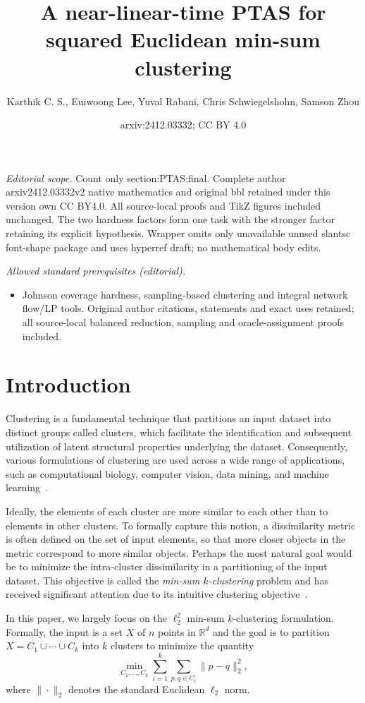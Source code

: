 \documentclass[10pt,a4paper]{amsart}
\title{A near-linear-time PTAS for squared Euclidean min-sum clustering}
\author{Karthik C. S., Euiwoong Lee, Yuval Rabani, Chris Schwiegelshohn, Samson Zhou}
\date{arxiv:2412.03332; CC BY 4.0}
\begin{document}
\maketitle
\noindent\textit{Editorial scope.} Count only section:PTAS:final. Complete author arxiv2412.03332v2 native mathematics and original bbl retained under this version own CC BY4.0. All source-local proofs and TikZ figures included unchanged. The two hardness factors form one task with the stronger factor retaining its explicit hypothesis. Wrapper omits only unavailable unused slantsc font-shape package and uses hyperref draft; no mathematical body edits.\par\medskip
\noindent\textit{Allowed standard prerequisites (editorial).}\begin{itemize}
\item Johnson coverage hardness, sampling-based clustering and integral network flow/LP tools. Original author citations, statements and exact uses retained; all source-local balanced reduction, sampling and oracle-assignment proofs included.
\end{itemize}\medskip
\section{Introduction}
Clustering is a fundamental technique that partitions an input dataset into distinct groups called clusters, which facilitate the identification and subsequent utilization of latent structural properties underlying the dataset. 
Consequently, various formulations of clustering are used across a wide range of applications, such as computational biology, computer vision, data mining, and machine learning~\cite{jain1999data,xu2005survey}. 

Ideally, the elements of each cluster are more similar to each other than to elements in other clusters. 
To formally capture this notion, a dissimilarity metric is often defined on the set of input elements, so that more closer objects in the metric correspond to more similar objects. 
Perhaps the most natural goal would be to minimize the intra-cluster dissimilarity in a partitioning of the input dataset. 
This objective is called the \emph{min-sum $k$-clustering} problem and has received significant attention due to its intuitive clustering objective~\cite{Guttmann-BeckH98a,Indyk99,Matousek00,Schulman00,BartalCR01,VegaKKR03,CzumajS07,AloiseDHP09,BehsazFSS19,BanerjeeOR21,Cohen-AddadSL21}. 

In this paper, we largely focus on the $\ell_2^2$ min-sum $k$-clustering formulation. 
Formally, the input is a set $X$ of $n$ points in $\mathbb{R}^d$ and the goal is to partition $X=C_1\dot\cup\cdots\dot\cup C_k$ into $k$ clusters to minimize the quantity
\[\min_{C_1,\ldots,C_k}\sum_{i=1}^k\sum_{p,q\in C_i}\|p-q\|_2^2,\]
where $\|\cdot\|_2$ denotes the standard Euclidean $\ell_2$ norm. 
\end{document}
